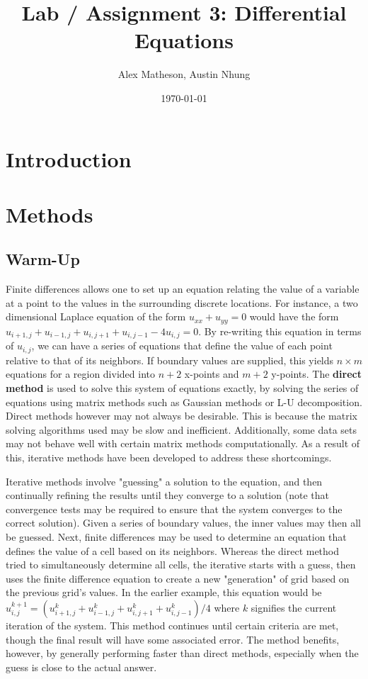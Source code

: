 \documentclass[twocolumn]{article}
\begin{document}
\title{Lab / Assignment 3: Differential Equations}
\author{Alex Matheson, Austin Nhung}
\date{\today}
\maketitle

\section{Introduction}

\section{Methods}
\subsection{Warm-Up}
Finite differences allows one to set up an equation relating the value of a variable at a point to the values in the surrounding discrete locations. For instance, a two dimensional Laplace equation of the form $u_{xx} + u_{yy} = 0$ would have the form $u_{i+1,j} + u_{i-1,j} + u_{i,j+1} + u_{i,j-1} - 4u_{i,j} = 0$. By re-writing this equation in terms of $u_{i,j}$, we can have a series of equations that define the value of each point relative to that of its neighbors. If boundary values are supplied, this yields $n\times m$ equations for a region divided into $n+2$ x-points and $m+2$ y-points. The \textbf{direct method} is used to solve this system of equations exactly, by solving the series of equations using matrix methods such as Gaussian methods or L-U decomposition. Direct methods however may not always be desirable. This is because the matrix solving algorithms used may be slow and inefficient. Additionally, some data sets may not behave well with certain matrix methods computationally. As a result of this, iterative methods have been developed to address these shortcomings.

Iterative methods involve "guessing" a solution to the equation, and then continually refining the results until they converge to a solution (note that convergence tests may be required to ensure that the system converges to the correct solution). Given a series of boundary values, the inner values may then all be guessed. Next, finite differences may be used to determine an equation that defines the value of a cell based on its neighbors. Whereas the direct method tried to simultaneously determine all cells, the iterative starts with a guess, then uses the  finite difference equation to create a new "generation" of grid based on the previous grid's values. In the earlier example, this equation would be $u_{i,j}^{k+1} = (u_{i+1,j}^{k} + u_{i-1,j}^{k} + u_{i,j+1}^{k} + u_{i,j-1}^{k})/4 $ where $k$ signifies the current iteration of the system. This method continues until certain criteria are met, though the final result will have some associated error. The method benefits, however, by generally performing faster than direct methods, especially when the guess is close to the actual answer.
\end{document}
